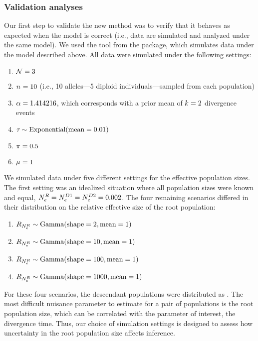 \subsubsection{Validation analyses}
Our first step to validate the new method was to verify that it behaves as
expected when the model is correct (i.e., data are simulated and analyzed under
the same model).
We used the \simcoevolity tool from the \ecoevolity package, which simulates
data under the model described above.
All data were simulated under the following settings:
\begin{enumerate}
    \item $\ncomparisons = 3$
    \item $\allelecount = 10$ (i.e., 10 alleles---5 diploid
        individuals---sampled from each population)
    \item $\concentration = 1.414216$, which corresponds with a prior mean of
        $\nevents = 2$ divergence events
    \item $\divtime \sim \dexponential{0.01}$
    \item $\gfreq = 0.5$
    \item $\murate = 1$
\end{enumerate}
We simulated data under five different settings for the effective population
sizes.
The first setting was an idealized situation where all population sizes were
known and equal,
$\epopsize[\rootpopindex] = 
\epopsize[\descendantpopindex{1}] =
\epopsize[\descendantpopindex{2}] = 0.002$.
The four remaining scenarios differed in their distribution on the relative
effective size of the root population:
\begin{enumerate}
    \item $\rootrelativepopsize \sim \dgamma{2}{1}$
    \item $\rootrelativepopsize \sim \dgamma{10}{1}$
    \item $\rootrelativepopsize \sim \dgamma{100}{1}$
    \item $\rootrelativepopsize \sim \dgamma{1000}{1}$
\end{enumerate}
For these four scenarios, the descendant populations were distributed as
.
The most difficult nuisance parameter to estimate for a pair of populations is
the root population size, which can be correlated with the parameter of
interest, the divergence time.
Thus, our choice of simulation settings is designed to assess how uncertainty
in the root population size affects inference.

